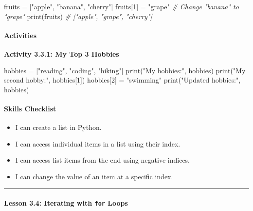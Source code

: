 \documentclass[
  justified,
  openright,
]{tufte-book}
\let\subsection\paragraph
\let\paragraph\paragraph
\newcommand{\StringTok}[1]{\textcolor{CodeString}{#1}}              %
\newcommand{\CommentTok}[1]{\textcolor{CodeComment}{\textit{#1}}}  %
\newcommand{\CodeNumTok}[1]{\textcolor{CodeNumber}{#1}}             %
\newcommand{\OperatorTok}[1]{\textcolor{DarkGray}{#1}}              %
\newenvironment{Shaded}{%
  \begin{mdframed}[style=TufteCode]%
}{%
  \end{mdframed}%
}
\let\subsection\paragraph
\let\paragraph\paragraph
\providecommand{\tightlist}{%
  \setlength{\itemsep}{0pt}\setlength{\parskip}{0pt}}
\begin{document}
\begin{Shaded}
\begin{Highlighting}[]
fruits \OperatorTok{=} [\StringTok{"apple"}, \StringTok{"banana"}, \StringTok{"cherry"}]
fruits[\CodeNumTok{1}] \OperatorTok{=} \StringTok{"grape"}  \CommentTok{\# Change "banana" to "grape"}
print(fruits)         \CommentTok{\# ["apple", "grape", "cherry"]}
\end{Highlighting}
\end{Shaded}

\subsection{Activities}\label{activities-9}

\textbf{Activity 3.3.1: My Top 3 Hobbies}

\begin{Shaded}
\begin{Highlighting}[]
hobbies \OperatorTok{=} [\StringTok{"reading"}, \StringTok{"coding"}, \StringTok{"hiking"}]
print(\StringTok{"My hobbies:"}, hobbies)
print(\StringTok{"My second hobby:"}, hobbies[\CodeNumTok{1}])
hobbies[\CodeNumTok{2}] \OperatorTok{=} \StringTok{"swimming"}
print(\StringTok{"Updated hobbies:"}, hobbies)
\end{Highlighting}
\end{Shaded}

\subsection{Skills Checklist}\label{skills-checklist-14}

\begin{itemize}
\tightlist
\item[$\square$]
  I can create a list in Python.
\item[$\square$]
  I can access individual items in a list using their index.
\item[$\square$]
  I can access list items from the end using negative indices.
\item[$\square$]
  I can change the value of an item at a specific index.
\end{itemize}

\begin{center}\rule{0.5\linewidth}{0.5pt}\end{center}

\subsection{\texorpdfstring{Lesson 3.4: Iterating with \texttt{for}
Loops}{Lesson 3.4: Iterating with for Loops}}\label{lesson-3.4-iterating-with-for-loops}
\end{document}
